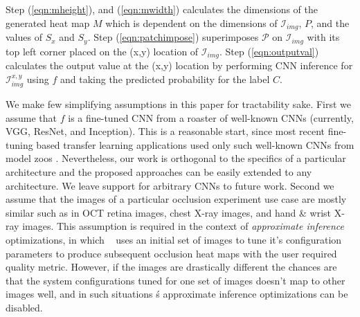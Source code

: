 Step (\ref{eqn:mheight}), and (\ref{eqn:mwidth}) calculates the dimensions of the generated heat map $M$ which is dependent on the dimensions of $\mathcal{I}_{img}$, $P$, and the values of $S_{x}$ and $S_{y}$.
Step (\ref{eqn:patchimpose}) superimposes $\mathcal{P}$ on $\mathcal{I}_{img}$ with its top left corner placed on the (x,y) location of $\mathcal{I}_{img}$.
Step (\ref{eqn:outputval}) calculates the output value at the (x,y) location by performing CNN inference for $\mathcal{I}_{img}^{x,y}$ using $f$ and taking the predicted probability for the label $C$.

We make few simplifying assumptions in this paper for tractability sake.
First we assume that $f$ is a fine-tuned CNN from a roaster of well-known CNNs (currently, VGG, ResNet, and Inception).
This is a reasonable start, since most recent fine-tuning based transfer learning applications used only such well-known CNNs from model zoos \cite{caffemodelzoo, tfmodelzoo}.
Nevertheless, our work is orthogonal to the specifics of a particular architecture and the proposed approaches can be easily extended to any architecture.
We leave support for arbitrary CNNs to future work.
Second we assume that the images of a particular occlusion experiment use case are mostly similar such as in OCT retina images, chest X-ray images, and hand \& wrist X-ray images.
This assumption is required in the context of \textit{approximate inference} optimizations, in which \system~ uses an initial set of images to tune it's configuration parameters to produce subsequent occlusion heat maps with the user required quality metric.
However, if the images are drastically different the chances are that the system configurations tuned for one set of images doesn't map to other images well, and in such situations \system\'s approximate inference optimizations can be disabled.